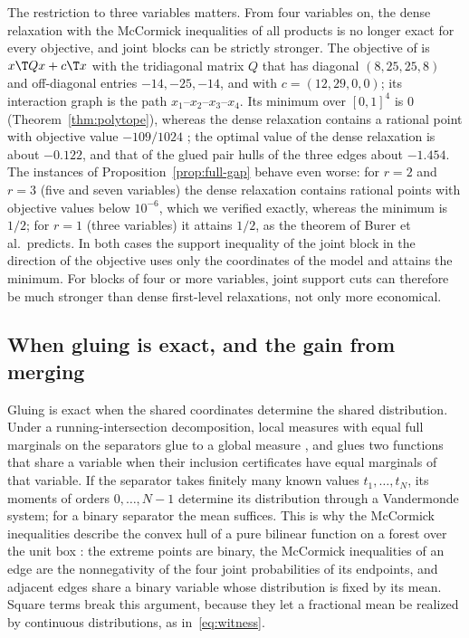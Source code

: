 The restriction to three variables matters. From four variables on, the dense
relaxation with the McCormick inequalities of all products is no longer exact
for every objective, and joint blocks can be strictly stronger. The objective of
\citet[Example~4]{BurerNatarajanWillemsen2025} is $x\T Qx+c\T x$ with the
tridiagonal matrix $Q$ that has diagonal $(8,25,25,8)$ and off-diagonal
entries $-14,-25,-14$, and with $c=(12,29,0,0)$; its interaction graph is the
path $x_1$--$x_2$--$x_3$--$x_4$. Its minimum over $[0,1]^4$ is $0$
(Theorem~\ref{thm:polytope}), whereas the dense relaxation contains a rational
point with objective value $-109/1024$ \citep[Section~6.4]{BurerNatarajanWillemsen2025};
the optimal value of the dense relaxation is about $-0.122$, and that of the
glued pair hulls of the three edges about $-1.454$. The instances of Proposition~\ref{prop:full-gap}
behave even worse: for $r=2$ and $r=3$ (five and seven variables) the dense
relaxation contains rational points with objective values below $10^{-6}$,
which we verified exactly, whereas the minimum is $1/2$; for $r=1$ (three
variables) it attains $1/2$, as the theorem of Burer et al.\ predicts. In both cases the
support inequality of the joint block in the direction of the objective uses
only the coordinates of the model and attains the minimum. For blocks of four
or more variables, joint support cuts can therefore be much stronger than dense
first-level relaxations, not only more economical.

\subsection{When gluing is exact, and the gain from merging}\label{sec:gluing}

Gluing is exact when the shared coordinates determine the shared
distribution. Under a running-intersection decomposition, local measures
with equal full marginals on the separators glue to a global measure
\citep{Vorobev1962,Lasserre2006}, and \citet[Corollary~3.10]{Tawarmalani2010}
glues two functions that share a variable when their inclusion certificates
have equal marginals of that variable. If the separator takes finitely many
known values $t_1,\dots,t_N$, its moments of orders $0,\dots,N-1$ determine
its distribution through a Vandermonde system; for a binary separator the
mean suffices. This is why the McCormick inequalities describe the convex
hull of a pure bilinear function on a forest over the unit box
\citep[Proposition~8]{Padberg1989}: the extreme points are binary, the
McCormick inequalities of an edge are the nonnegativity of the four joint
probabilities of its endpoints, and adjacent edges share a binary variable
whose distribution is fixed by its mean. Square terms break this argument,
because they let a fractional mean be realized by continuous distributions,
as in~\eqref{eq:witness}.

